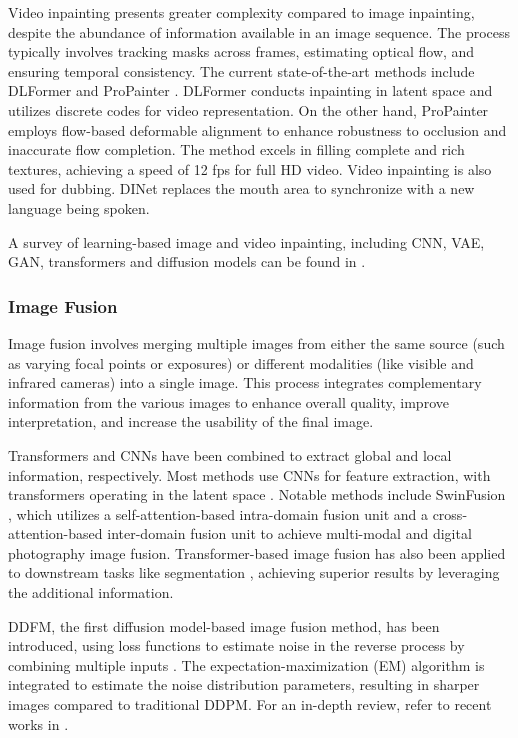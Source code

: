 \documentclass[11pt,a4paper]{article}
\begin{document}
Video inpainting presents greater complexity compared to image inpainting, despite the abundance of information available in an image sequence. The process typically involves tracking masks across frames, estimating optical flow, and ensuring temporal consistency.  The current state-of-the-art methods include DLFormer \cite{Ren:DLFormer:2022} and  ProPainter \cite{Zhou:ProPainter:2023}. DLFormer conducts inpainting in latent space and utilizes discrete codes for video representation. On the other hand, ProPainter employs flow-based deformable alignment to enhance robustness to occlusion and inaccurate flow completion. The method excels in filling complete and rich textures, achieving a speed of 12 fps for full HD video. Video inpainting is also used for dubbing. DINet \cite{Zhang:DINet:2023} replaces the mouth area to synchronize with a new language being spoken.

A survey of learning-based image and video inpainting,  including CNN, VAE, GAN, transformers and diffusion models can be found in \cite{quan:deep:2024}.

\subsubsection{Image Fusion}
\label{sssec:fusion}

Image fusion involves merging multiple images from either the same source (such as varying focal points or exposures) or different modalities (like visible and infrared cameras) into a single image. This process integrates complementary information from the various images to enhance overall quality, improve interpretation, and increase the usability of the final image.

Transformers and CNNs have been combined to extract global and local information, respectively. Most methods use CNNs for feature extraction, with transformers operating in the latent space \cite{Ma:SwinFusion:2022, Rao:TGFuse:2023}. Notable methods include SwinFusion \cite{Ma:SwinFusion:2022}, which utilizes a self-attention-based intra-domain fusion unit and a cross-attention-based inter-domain fusion unit to achieve multi-modal and digital photography image fusion. Transformer-based image fusion has also been applied to downstream tasks like segmentation \cite{Liu:Multi:2023}, achieving superior results by leveraging the additional information. 

DDFM, the first diffusion model-based image fusion method, has been introduced, using loss functions to estimate noise in the reverse process by combining multiple inputs \cite{Zhao:DDFM:2023}. The expectation-maximization (EM) algorithm is integrated to estimate the noise distribution parameters, resulting in sharper images compared to traditional DDPM. For an in-depth review, refer to recent works in \cite{Karim:Current:2023, Zhang:Visible:2023}.
\end{document}
